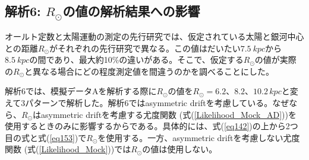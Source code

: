 


\subsection{解析6: $R_{\odot}$の値の解析結果への影響}
オールト定数と太陽運動の測定の先行研究では、仮定されている太陽と銀河中心との距離$R_{\odot}$がそれぞれの先行研究で異なる。この値はだいたい$\SI{7.5}{kpc}$から$\SI{8.5}{kpc}$の間であり、最大約10\%の違いがある。そこで、仮定する$R_{\odot}$の値が実際の$R_{\odot}$と異なる場合にどの程度測定値を間違うのかを調べることにした。

解析6では、模擬データAを解析する際に$R_{\odot}$の値を$R_{\odot} = 6.2、8.2、10.2\,\si{kpc}$と変えて3パターンで解析した。解析6ではasymmetric driftを考慮している。なぜなら、$R_{\odot}$はasymmetric driftを考慮する尤度関数 (式(\ref{Likelihood_Mock_AD}))を使用するときのみに影響するからである。具体的には、式(\ref{eq142})の上から2つ目の式と式(\ref{eq153})で$R_{\odot}$を使用する。一方、asymmetric driftを考慮しない尤度関数 (式(\ref{Likelihood_Mock}))では$R_{\odot}$の値は使用しない。

